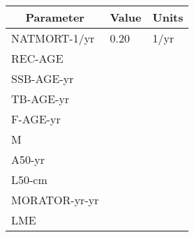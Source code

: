 \begin{tabular}{lll}
\toprule
\multicolumn{1}{c}{\textbf{Parameter}} & \multicolumn{1}{c}{\textbf{Value}} & \multicolumn{1}{c}{\textbf{Units}} \\
\midrule
NATMORT-1/yr  & 0.20 & 1/yr \\
REC-AGE       &      &      \\
SSB-AGE-yr    &      &      \\
TB-AGE-yr     &      &      \\
F-AGE-yr      &      &      \\
M             &      &      \\
A50-yr        &      &      \\
L50-cm        &      &      \\
MORATOR-yr-yr &      &      \\
LME           &      &      \\
\bottomrule
\end{tabular}
